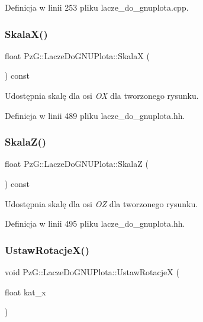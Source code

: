 Definicja w linii 253 pliku lacze\+\_\+do\+\_\+gnuplota.\+cpp.

\mbox{\label{class_pz_g_1_1_lacze_do_g_n_u_plota_a4b1eb252fd785a5aeff938e7b2dce2b1}} 
\subsubsection{\texorpdfstring{SkalaX()}{SkalaX()}}
{\footnotesize\ttfamily float Pz\+G\+::\+Lacze\+Do\+G\+N\+U\+Plota\+::\+SkalaX (\begin{DoxyParamCaption}{ }\end{DoxyParamCaption}) const\hspace{0.3cm}{\ttfamily [inline]}}

Udostępnia skalę dla osi {\itshape OX} dla tworzonego rysunku. 

Definicja w linii 489 pliku lacze\+\_\+do\+\_\+gnuplota.\+hh.

\mbox{\label{class_pz_g_1_1_lacze_do_g_n_u_plota_a44f922ccbc508d6cd7809c669238dae3}} 
\subsubsection{\texorpdfstring{SkalaZ()}{SkalaZ()}}
{\footnotesize\ttfamily float Pz\+G\+::\+Lacze\+Do\+G\+N\+U\+Plota\+::\+SkalaZ (\begin{DoxyParamCaption}{ }\end{DoxyParamCaption}) const\hspace{0.3cm}{\ttfamily [inline]}}

Udostępnia skalę dla osi {\itshape OZ} dla tworzonego rysunku. 

Definicja w linii 495 pliku lacze\+\_\+do\+\_\+gnuplota.\+hh.

\mbox{\label{class_pz_g_1_1_lacze_do_g_n_u_plota_a88324c53a70846fb6bc9d918ce21fd56}} 
\subsubsection{\texorpdfstring{UstawRotacjeX()}{UstawRotacjeX()}}
{\footnotesize\ttfamily void Pz\+G\+::\+Lacze\+Do\+G\+N\+U\+Plota\+::\+Ustaw\+RotacjeX (\begin{DoxyParamCaption}\item[{float}]{kat\+\_\+x }\end{DoxyParamCaption})\hspace{0.3cm}{\ttfamily [inline]}}

